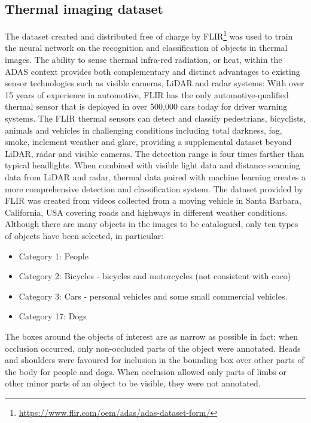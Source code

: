 \subsection{Thermal imaging dataset}
\label{ssec:thermal-image-dataset}
The dataset created and distributed free of charge by
FLIR\footnote{\href{https://www.flir.com/oem/adas/adas-dataset-form/}{https://www.flir.com/oem/adas/adas-dataset-form/}}
was used to train the neural network on the recognition and classification of
objects in thermal images. The ability to sense thermal infra-red radiation, or
heat, within the ADAS context provides both complementary and distinct
advantages to existing sensor technologies such as visible cameras, LiDAR and
radar systems: With over 15 years of experience in automotive, FLIR has the only
automotive-qualified thermal sensor that is deployed in over 500,000 cars today
for driver warning systems. The FLIR thermal sensors can detect and classify
pedestrians, bicyclists, animals and vehicles in challenging conditions
including total darkness, fog, smoke, inclement weather and glare, providing a
supplemental dataset beyond LiDAR, radar and visible cameras. The detection
range is four times farther than typical headlights. When combined with visible
light data and distance scanning data from LiDAR and radar, thermal data paired
with machine learning creates a more comprehensive detection and classification
system.\cite{flirdataset}\hfill\break
The dataset provided by FLIR was created from videos collected from a moving
vehicle in Santa Barbara, California, USA covering roads and highways in
different weather conditions. Although there are many objects in the images to
be catalogued, only ten types of objects have been selected, in particular:
\begin{itemize}
\item Category 1: People
\item Category 2: Bicycles - bicycles and motorcycles (not consistent with coco)
\item Category 3: Cars - personal vehicles and some small commercial vehicles.
\item Category 17: Dogs
\end{itemize}
%
The boxes around the objects of interest are as narrow as possible in fact: when
occlusion occurred, only non-occluded parts of the object were annotated. Heads
and shoulders were favoured for inclusion in the bounding box over other parts of
the body for people and dogs. When occlusion allowed only parts of limbs or
other minor parts of an object to be visible, they were not annotated. 
